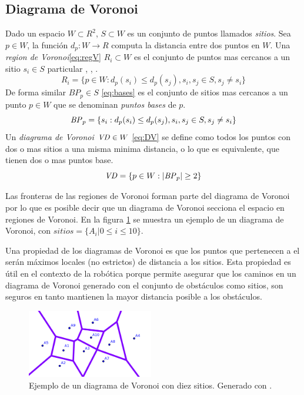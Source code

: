 \subsection{Diagrama de Voronoi}
Dado un espacio $W \subset R^2$, $S \subset W$ es un conjunto de puntos llamados \emph{sitios}. Sea $p\in W$, la función $d_p : W \rightarrow R$ computa la distancia entre dos puntos en $W$. Una \emph{region de Voronoi}\ref{eq:regV} $R_i\subset W$ es el conjunto de puntos mas cercanos a un sitio $s_i\in S$ particular \cite{choset2005principles}, \cite{Thrun1998}, \cite{Liu2015}.
\begin{equation}
  R_i = \{p \in W : d_p(s_i) \leq d_p(s_j), s_i,s_j\in S,s_j \neq s_i\}\label{eq:regV}
\end{equation}
De forma similar $BP_p \in S$ \ref{eq:bases} es el conjunto de sitios mas cercanos a un punto $p \in W$ que se denominan \emph{puntos bases} de $p$.
\begin{equation}
  \mathit{BP}_p =\{s_i : d_p(s_i) \leq d_p(s_j), s_i,s_j\in S,s_j \neq s_i\}\label{eq:bases}
\end{equation}
Un \emph{diagrama de Voronoi} $\mathit{VD}\in W$ \ref{eq:DV} se define como todos los puntos con dos o mas sitios a una misma minima distancia, o lo que es equivalente, que tienen dos o mas puntos base.
\begin{equation}
  \mathit{VD} = \{p \in W : |\mathit{BP}_p| \geq 2\}\label{eq:DV}
\end{equation}

Las fronteras de las regiones de Voronoi forman parte del diagrama de Voronoi por lo que es posible decir que un diagrama de Voronoi secciona el espacio en regiones de Voronoi. En la figura \ref{fig:ejemploVoronoi} se muestra un ejemplo de un diagrama de Voronoi, con $sitios=\{A_i | 0\leq i \leq 10\}$.

Una propiedad de los diagramas de Voronoi es que los puntos que pertenecen a el serán máximos locales (no estrictos) de distancia a los sitios. Esta propiedad es útil en el contexto de la robótica porque permite asegurar que los caminos en un diagrama de Voronoi generado con el conjunto de obstáculos como sitios, son seguros en tanto mantienen la mayor distancia posible a los obstáculos.

\begin{figure}[H]
  \center
  \includegraphics[width=5.5cm]{imagenes/VD.png}
  \caption{Ejemplo de un diagrama de Voronoi con diez sitios. Generado con \cite{voronoigeo}.}\label{fig:ejemploVoronoi}
\end{figure} 

